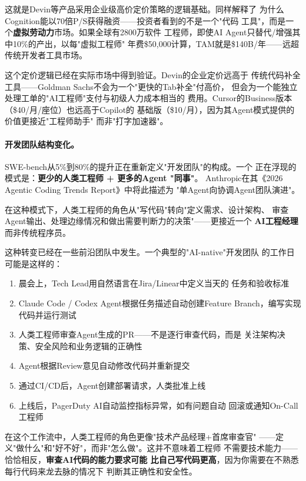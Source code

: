 这就是Devin等产品采用企业级高价定价策略的逻辑基础。同样解释了
为什么Cognition能以70倍P/S获得融资——投资者看到的不是一个"代码
工具"，而是一个\textbf{虚拟劳动力}市场。如果全球有2800万软件
工程师，即使AI Agent只替代/增强其中10\%的产出，以每"虚拟工程师"
年费\$50,000计算，TAM就是\$140B/年——远超传统开发者工具市场。

这个定价逻辑已经在实际市场中得到验证。Devin的企业定价远高于
传统代码补全工具——Goldman Sachs不会为一个"更快的Tab补全"付高价，
但会为一个能独立处理工单的"AI工程师"支付与初级人力成本相当的
费用。Cursor的Business版本（\$40/月/座位）也远高于Copilot的
基础版（\$10/月），因为其Agent模式提供的价值更接近"工程师助手"
而非"打字加速器"。

\paragraph{开发团队结构变化。}
SWE-bench从5\%到80\%的提升正在重新定义"开发团队"的构成。一个
正在浮现的模式是：\textbf{更少的人类工程师 + 更多的Agent "同事"}。
Anthropic在其《2026 Agentic Coding Trends Report》中将此描述为
"单Agent向协调Agent团队演进"。

在这种模式下，人类工程师的角色从"写代码"转向"定义需求、设计架构、
审查Agent输出、处理边缘情况和做出需要判断力的决策"——更接近一个
\textbf{AI工程经理}而非传统程序员。

这种转变已经在一些前沿团队中发生。一个典型的"AI-native"开发团队
的工作日可能是这样的：

\begin{enumerate}
  \item 晨会上，Tech Lead用自然语言在Jira/Linear中定义当天的
    任务和验收标准
  \item Claude Code / Codex Agent根据任务描述自动创建Feature
    Branch，编写实现代码并运行测试
  \item 人类工程师审查Agent生成的PR——不是逐行审查代码，而是
    关注架构决策、安全风险和业务逻辑的正确性
  \item Agent根据Review意见自动修改代码并重新提交
  \item 通过CI/CD后，Agent创建部署请求，人类批准上线
  \item 上线后，PagerDuty AI自动监控指标异常，如有问题自动
    回滚或通知On-Call工程师
\end{enumerate}

在这个工作流中，人类工程师的角色更像"技术产品经理+首席审查官"
——定义"做什么"和"好不好"，而非"怎么做"。这并不意味着工程师
不需要技术能力——恰恰相反，\textbf{审查AI代码的能力要求可能
比自己写代码更高}，因为你需要在不熟悉每行代码来龙去脉的情况下
判断其正确性和安全性。

